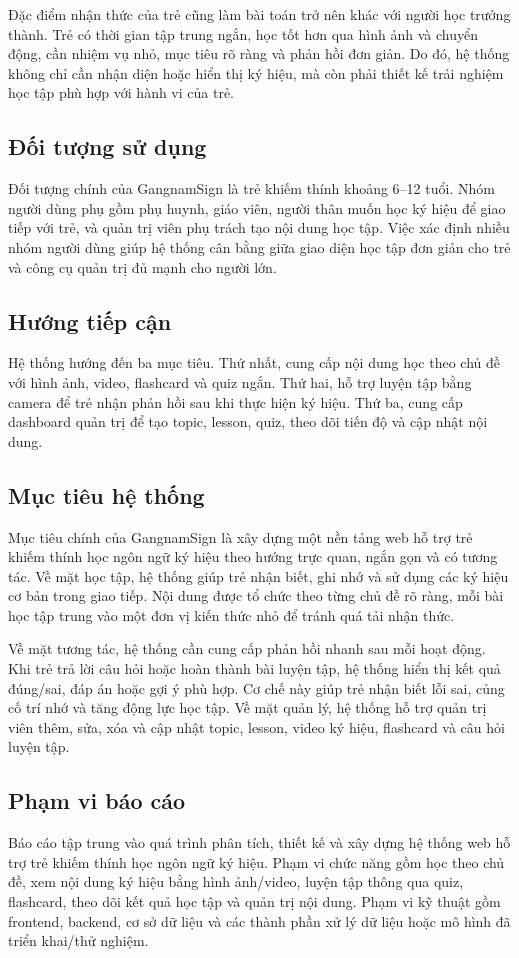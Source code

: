 \documentclass[conference]{IEEEtran}
\begin{document}
Đặc điểm nhận thức của trẻ cũng làm bài toán trở nên khác với người học trưởng thành. Trẻ có thời gian tập trung ngắn, học tốt hơn qua hình ảnh và chuyển động, cần nhiệm vụ nhỏ, mục tiêu rõ ràng và phản hồi đơn giản. Do đó, hệ thống không chỉ cần nhận diện hoặc hiển thị ký hiệu, mà còn phải thiết kế trải nghiệm học tập phù hợp với hành vi của trẻ.

\subsection{Đối tượng sử dụng}
Đối tượng chính của GangnamSign là trẻ khiếm thính khoảng 6--12 tuổi. Nhóm người dùng phụ gồm phụ huynh, giáo viên, người thân muốn học ký hiệu để giao tiếp với trẻ, và quản trị viên phụ trách tạo nội dung học tập. Việc xác định nhiều nhóm người dùng giúp hệ thống cân bằng giữa giao diện học tập đơn giản cho trẻ và công cụ quản trị đủ mạnh cho người lớn.

\subsection{Hướng tiếp cận}
Hệ thống hướng đến ba mục tiêu. Thứ nhất, cung cấp nội dung học theo chủ đề với hình ảnh, video, flashcard và quiz ngắn. Thứ hai, hỗ trợ luyện tập bằng camera để trẻ nhận phản hồi sau khi thực hiện ký hiệu. Thứ ba, cung cấp dashboard quản trị để tạo topic, lesson, quiz, theo dõi tiến độ và cập nhật nội dung.

\subsection{Mục tiêu hệ thống}
Mục tiêu chính của GangnamSign là xây dựng một nền tảng web hỗ trợ trẻ khiếm thính học ngôn ngữ ký hiệu theo hướng trực quan, ngắn gọn và có tương tác. Về mặt học tập, hệ thống giúp trẻ nhận biết, ghi nhớ và sử dụng các ký hiệu cơ bản trong giao tiếp. Nội dung được tổ chức theo từng chủ đề rõ ràng, mỗi bài học tập trung vào một đơn vị kiến thức nhỏ để tránh quá tải nhận thức.

Về mặt tương tác, hệ thống cần cung cấp phản hồi nhanh sau mỗi hoạt động. Khi trẻ trả lời câu hỏi hoặc hoàn thành bài luyện tập, hệ thống hiển thị kết quả đúng/sai, đáp án hoặc gợi ý phù hợp. Cơ chế này giúp trẻ nhận biết lỗi sai, củng cố trí nhớ và tăng động lực học tập. Về mặt quản lý, hệ thống hỗ trợ quản trị viên thêm, sửa, xóa và cập nhật topic, lesson, video ký hiệu, flashcard và câu hỏi luyện tập.

\subsection{Phạm vi báo cáo}
Báo cáo tập trung vào quá trình phân tích, thiết kế và xây dựng hệ thống web hỗ trợ trẻ khiếm thính học ngôn ngữ ký hiệu. Phạm vi chức năng gồm học theo chủ đề, xem nội dung ký hiệu bằng hình ảnh/video, luyện tập thông qua quiz, flashcard, theo dõi kết quả học tập và quản trị nội dung. Phạm vi kỹ thuật gồm frontend, backend, cơ sở dữ liệu và các thành phần xử lý dữ liệu hoặc mô hình đã triển khai/thử nghiệm.
\end{document}
